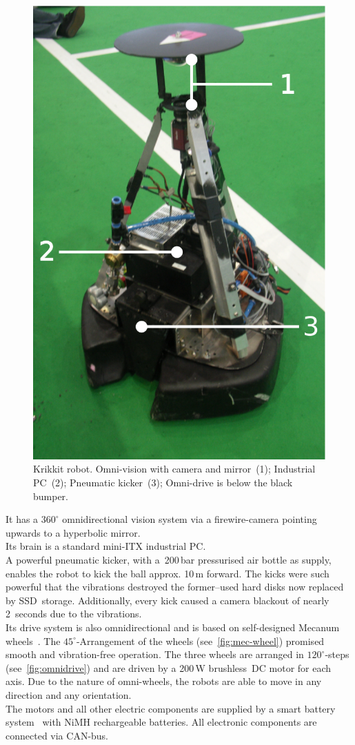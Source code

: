 \documentclass[12pt,a4paper]{article}
\begin{document}
\begin{figure}[ht]
\begin{center}
\includegraphics[width=0.5\columnwidth]{figures/krikkit.pdf}
\caption{\label{fig:krikkit}
Krikkit robot. Omni-vision with camera and mirror~(1); Industrial PC~(2); Pneumatic kicker~(3); Omni-drive is below the black bumper.
}
\end{center}
\end{figure}

It has a $360^\circ$ omnidirectional vision system via a firewire-camera pointing upwards to a hyperbolic mirror.\\
Its brain is a standard mini-ITX industrial PC.\\
A powerful pneumatic kicker, with a~200\,bar pressurised air bottle as supply, enables the robot to kick the ball approx. 10\,m forward.
The kicks were such powerful that the vibrations destroyed the former--used hard disks now replaced by SSD~storage.
Additionally, every kick caused a camera blackout of nearly 2~seconds due to the vibrations.\\
Its drive system is also omnidirectional and is based on self-designed Mecanum wheels~\cite{mecanum2007}. 
The $45^\circ$\mbox{-}Arrangement of the wheels (see~\autoref{fig:mec-wheel}) promised smooth and vibration-free operation.
The three wheels are arranged in $120^\circ$\mbox{-}steps (see~\autoref{fig:omnidrive}) and are driven by a 200\,W brushless~DC motor for each axis.
Due to the nature of omni-wheels, the robots are able to move in any direction and any orientation.\\
The motors and all other electric components are supplied by a smart battery system~\cite{krammer06} with NiMH rechargeable batteries.
All electronic components are connected via CAN-bus.
\end{document}

